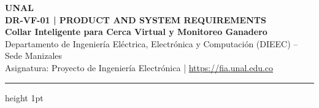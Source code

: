 \documentclass[10pt,letterpaper]{article}
\begin{document}
\begin{center}
    {\Huge \bfseries UNAL}\\[0.15cm]
    {\Large \bfseries DR-VF-01 | PRODUCT AND SYSTEM REQUIREMENTS}\\[0.1cm]
    {\large \bfseries Collar Inteligente para Cerca Virtual y Monitoreo Ganadero}\\[0.1cm]
    {\small \color{gray} Departamento de Ingeniería Eléctrica, Electrónica y Computación (DIEEC) -- Sede Manizales}\\
    {\small \color{gray} Asignatura: Proyecto de Ingeniería Electrónica | \url{https://fia.unal.edu.co}}
\end{center}

\vspace{-0.2cm}
\hrule height 1pt
\vspace{0.3cm}









\end{document}

